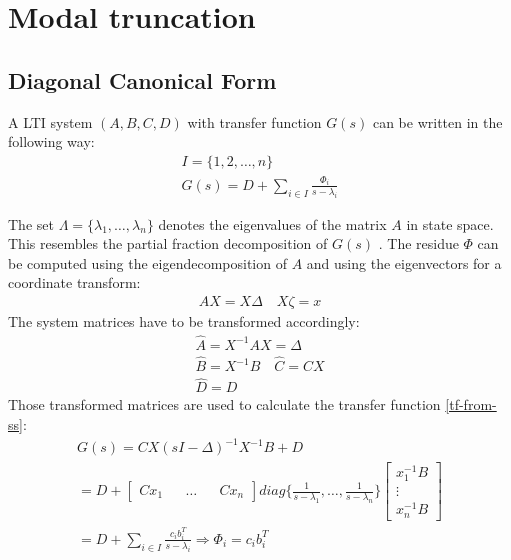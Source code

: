 \section{Modal truncation}
\subsection{Diagonal Canonical Form} \label{dcnf}
A LTI system \((A, B, C, D)\) with transfer function \(G(s)\) can be written in the following way:
\begin{gather}
I = \{1, 2, \hdots, n\} \\
G(s) = D + \sum_{i \in I} \frac{\Phi_i}{s-\lambda_i} \label{dcnf}
\end{gather}

The set \(\Lambda = \{\lambda_1, \hdots, \lambda_n\}\) denotes the eigenvalues of the matrix \(A\) in state space.
This resembles the partial fraction decomposition of \(G(s)\) \cite{vuillemin2020optimal}.
The residue \(\Phi\) can be computed using the eigendecomposition of \(A\) and using the eigenvectors for a coordinate transform:
\begin{gather}
AX = X\Delta \quad X \zeta =  x 
\end{gather}
The system matrices have to be transformed accordingly:
\begin{gather}
\hat{A} = X^{-1}AX = \Delta \\
\hat{B} = X^{-1}B \quad \hat{C} = CX \\
\hat{D} = D
\end{gather}
Those transformed matrices are used to calculate the transfer function \ref{tf-from-ss}:
\begin{gather}
G(s) = CX(sI - \Delta)^{-1}X^{-1}B + D\\
= D + \begin{bmatrix}
C x_1 && \hdots && Cx_n
\end{bmatrix} diag\{\frac{1}{s-\lambda_1}, \hdots, \frac{1}{s-\lambda_n}\} \begin{bmatrix}
x_1^{-1}B \\
\vdots \\
x_n^{-1}B
\end{bmatrix} \\
= D + \sum_{i \in I} \frac{c_i b_i^{T}}{s - \lambda_i} 
\Rightarrow \Phi_i = c_i b_i^{T}
\end{gather}
\cite{Benner}

